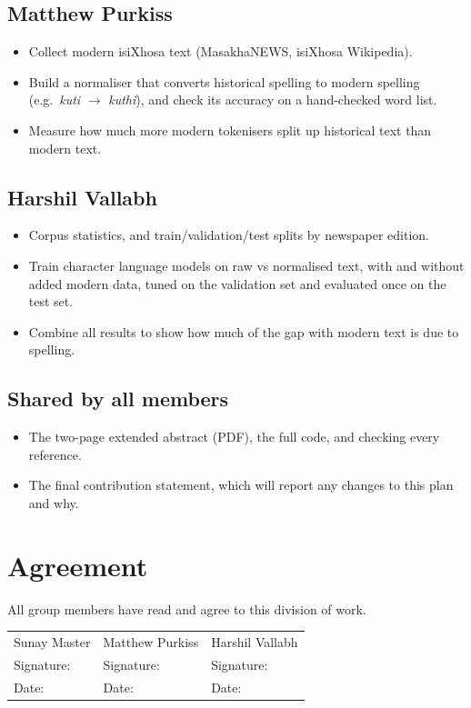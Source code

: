 \documentclass[11pt,a4paper]{article}
\begin{document}
\subsection*{Matthew Purkiss}
\begin{itemize}
  \item Collect modern isiXhosa text (MasakhaNEWS, isiXhosa Wikipedia).
  \item Build a normaliser that converts historical spelling to modern spelling
        (e.g.\ \emph{kuti} $\rightarrow$ \emph{kuthi}), and check its accuracy on a hand-checked word list.
  \item Measure how much more modern tokenisers split up historical text than modern text.
\end{itemize}

\subsection*{Harshil Vallabh}
\begin{itemize}
  \item Corpus statistics, and train/validation/test splits by newspaper edition.
  \item Train character language models on raw vs normalised text, with and without added modern
        data, tuned on the validation set and evaluated once on the test set.
  \item Combine all results to show how much of the gap with modern text is due to spelling.
\end{itemize}

\subsection*{Shared by all members}
\begin{itemize}
  \item The two-page extended abstract (PDF), the full code, and checking every reference.
  \item The final contribution statement, which will report any changes to this plan and why.
\end{itemize}

\section*{Agreement}

All group members have read and agree to this division of work.

\vspace{1em}
\begin{tabularx}{\textwidth}{@{}X X X@{}}
Sunay Master & Matthew Purkiss & Harshil Vallabh \\[1.6em]
Signature: \hrulefill & Signature: \hrulefill & Signature: \hrulefill \\[1em]
Date: \hrulefill & Date: \hrulefill & Date: \hrulefill \\
\end{tabularx}
\end{document}
